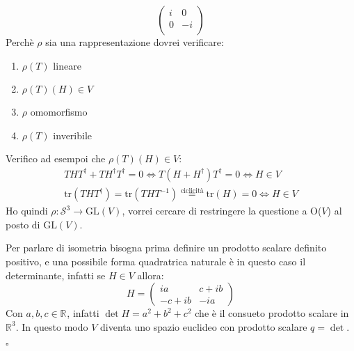 \documentclass[10pt, twoside=false, x11names]{scrbook}
\newenvironment{proof}{{\textbf{Dimostrazione}:}}{\hfill $\square$}
\newcommand{\RN}[1][]{\mathbb{R}^#1}
\newcommand{\Sph}[1][]{\mathcal{S}^#1}
\newcommand{\tr}{\mathrm{tr}}
\begin{document}
\begin{proof}
\[\begin{pmatrix}
      i & 0 \\
      0 & -i \\
    \end{pmatrix}
  \]
  Perchè $ \rho $ sia una rappresentazione dovrei verificare:
  \begin{enumerate}
  \item $ \rho(T) $ lineare
  \item $ \rho(T)(H) \in V $
  \item $ \rho $ omomorfismo
  \item $ \rho(T) $ inveribile
  \end{enumerate}
  Verifico ad esempoi che $ \rho(T)(H) \in V $:
  \begin{gather*}
    THT^\dagger + TH^\dagger T^\dagger = 0 \iff T(H + H^\dagger)T^\dagger = 0 \iff H \in V \\
    \tr(THT^\dagger) = \tr(THT^{-1}) \overset{\text{ciclicità}}{=} \tr(H) = 0 \iff H \in V
  \end{gather*}
  Ho quindi $ \rho \colon \Sph{3} \to \mathrm{GL}(V) $, vorrei cercare di restringere
  la questione a O($ V $) al posto di $ \mathrm{GL}(V) $.

  Per parlare di isometria bisogna prima definire un prodotto scalare definito
  positivo, e una possibile forma quadratrica naturale è in questo caso il determinante, infatti
  se $ H \in V $ allora:
  \[
    H =
    \begin{pmatrix}
      i a & c + i b \\
      -c + i b & - i a
    \end{pmatrix}
  \]
  Con $ a,b,c \in \RN{} $, infatti $ \det{H} = a^2 + b^2 + c^2 $ che è il consueto
  prodotto scalare in $ \RN{3} $. In questo modo $ V $ diventa uno spazio euclideo
  con prodotto scalare $ q = \det $.


\end{proof}
\end{document}
